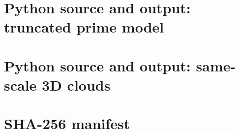 \documentclass[11pt]{amsart}
\theoremstyle{definition}
\theoremstyle{remark}
\begin{document}
\section{Python source and output: truncated prime model}



\section{Python source and output: same-scale 3D clouds}



\section{SHA-256 manifest}

\end{document}
